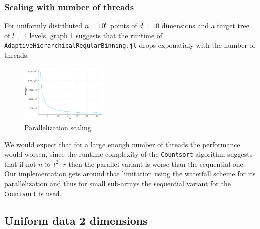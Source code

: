 \documentclass{juliacon}
\begin{document}


\subsubsection{Scaling with number of threads}
For uniformly distributed $n=10^6$ points of $d=10$ dimensions and a target tree of
$l=4$ levels, graph \ref{scale_t} suggests that the runtime of
\verb|AdaptiveHierarchicalRegularBinning.jl| drops exponatialy
with the number of threads.

\begin{figure}[!ht]
  \centerline{
    \includegraphics[width=10pc]{figures/experiments/scale_t.png}
  }
  \caption{ Parallelization scaling }
  \label{scale_t}
\end{figure}

We would expect that for a large enough number of threads the performance would worsen,
since the runtime complexity of the \verb|Countsort| algorithm suggests that if not
$n \gg t^2 \cdot r$ then the parallel variant is worse than the sequential one. Our
implementation gets around that limitation using the waterfall scheme for its
parallelization and thus for small sub-arrays the sequential variant for the
\verb|Countsort| is used.




\subsection{Uniform data 2 dimensions}
\end{document}
